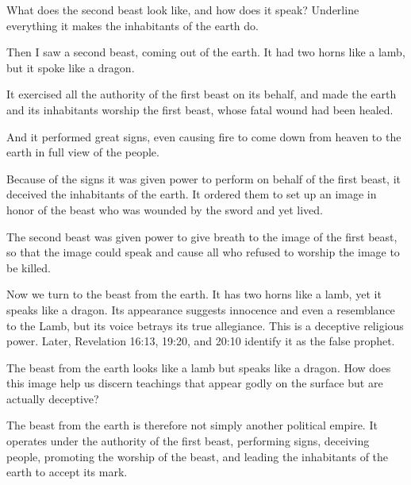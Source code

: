 \begin{ScriptureBox2}{What does the second beast look like, and how does it speak? Underline everything it makes the inhabitants of the earth do.}

\item[13:11] Then I saw a second beast, coming out of the earth. It had two horns like a lamb, but it spoke like a dragon.

\item[13:12] It exercised all the authority of the first beast on its behalf, and made the earth and its inhabitants worship the first beast, whose fatal wound had been healed.

\item[13:13] And it performed great signs, even causing fire to come down from heaven to the earth in full view of the people.

\item[13:14] Because of the signs it was given power to perform on behalf of the first beast, it deceived the inhabitants of the earth. It ordered them to set up an image in honor of the beast who was wounded by the sword and yet lived.

\item[13:15] The second beast was given power to give breath to the image of the first beast, so that the image could speak and cause all who refused to worship the image to be killed.

\end{ScriptureBox2}

Now we turn to the beast from the earth. It has two horns like a lamb, yet it speaks like a dragon. Its appearance suggests innocence and even a resemblance to the Lamb, but its voice betrays its true allegiance. This is a deceptive religious power. Later, Revelation 16:13, 19:20, and 20:10 identify it as the false prophet.

\begin{ReaderQuestion}
The beast from the earth looks like a lamb but speaks like a dragon. How does this image help us discern teachings that appear godly on the surface but are actually deceptive?
\end{ReaderQuestion}

The beast from the earth is therefore not simply another political empire. It operates under the authority of the first beast, performing signs, deceiving people, promoting the worship of the beast, and leading the inhabitants of the earth to accept its mark.


